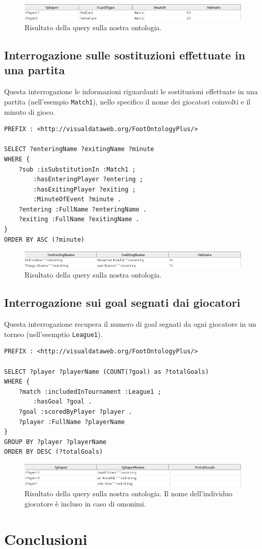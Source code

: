 \documentclass[11pt]{report} %
\begin{document}
\begin{figure}[H]
	\includegraphics[width=\textwidth]{query3}
	\caption{Risultato della query sulla nostra ontologia.}
\end{figure}

\section{Interrogazione sulle sostituzioni effettuate in una partita}

Questa interrogazione le informazioni riguardanti le sostituzioni effettuate in una partita (nell'esempio \texttt{Match1}), nello specifico il nome dei giocatori coinvolti e il minuto di gioco. 

\begin{lstlisting}
PREFIX : <http://visualdataweb.org/FootOntologyPlus/>

SELECT ?enteringName ?exitingName ?minute
WHERE {
    ?sub :isSubstitutionIn :Match1 ;
        :hasEnteringPlayer ?entering ;
        :hasExitingPlayer ?exiting ;
        :MinuteOfEvent ?minute .
    ?entering :FullName ?enteringName .
    ?exiting :FullName ?exitingName .
}
ORDER BY ASC (?minute)
\end{lstlisting}

\begin{figure}[H]
	\includegraphics[width=\textwidth]{query4}
	\caption{Risultato della query sulla nostra ontologia.}
\end{figure}

\section{Interrogazione sui goal segnati dai giocatori}

Questa interrogazione recupera il numero di goal segnati da ogni giocatore in un torneo (nell'esemptio \texttt{League1}).

\begin{lstlisting}
PREFIX : <http://visualdataweb.org/FootOntologyPlus/>

SELECT ?player ?playerName (COUNT(?goal) as ?totalGoals) 
WHERE {
    ?match :includedInTournament :League1 ;
        :hasGoal ?goal .
    ?goal :scoredByPlayer ?player .
    ?player :FullName ?playerName
}
GROUP BY ?player ?playerName
ORDER BY DESC (?totalGoals)
\end{lstlisting}

\begin{figure}[H]
	\includegraphics[width=\textwidth]{query5}
	\caption{Risultato della query sulla nostra ontologia. Il nome dell'individuo giocatore è incluso in caso di omonimi.}
\end{figure}



\chapter{Conclusioni}

\medspace

\printbibliography
\end{document}
